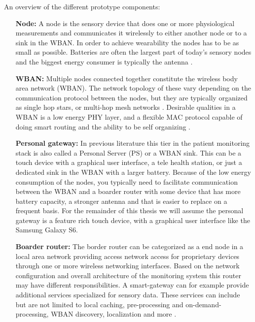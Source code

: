 
An overview of the different prototype components:
\begin{itemize}

  \item[\textbf{Node:}] A node is the sensory device that does one or more physiological measurements and communicates it wirelessly to either another node or to a sink in the WBAN. In order to achieve wearability the nodes has to be as small as possible. Batteries are often the largest part of today’s sensory nodes and the biggest energy consumer is typically the antenna \cite{Ullah:2010ci}.

  \item[\textbf{WBAN:}] Multiple nodes connected together constitute the wireless body area network (WBAN). The network topology of these vary depending on the communication protocol between the nodes, but they are typically organized as single hop stars, or multi-hop mesh networks \cite{Anonymous:6F6UBBK9}. Desirable qualities in a WBAN is a low energy PHY layer, and a flexible MAC protocol capable of doing smart routing and the ability to be self organizing \cite{Anonymous:XKViPHhV} \cite{Anonymous:OEjzuKTe}.

  \item[\textbf{Personal gateway:}] In previous literature this tier in the patient monitoring stack is also called a Personal Server (PS) or a WBAN sink. This can be a touch device with a graphical user interface, a tele health station, or just a dedicated sink in the WBAN with a larger battery. Because of the low energy consumption of the nodes, you typically need to facilitate communication between the WBAN and a boarder router with some device that has more battery capacity, a stronger antenna and that is easier to replace on a frequent basis. For the remainder of this thesis we will assume the personal gateway is a feature rich touch device, with a graphical user interface like the Samsung Galaxy S6.

  \item[\textbf{Boarder router:}] The border router can be categorized as a end node in a local area network providing access network access for proprietary devices through one or more wireless networking interfaces. Based on the network configuration and overall architecture of the monitoring system this router may have different responsibilities. A smart-gateway can for example provide additional services specialized for sensory data. These services can include but are not limited to local caching, pre-processing and on-demand-processing, WBAN discovery, localization and more \cite{DrAmirMohammadRahmani:2014vx}.


\end{itemize}

